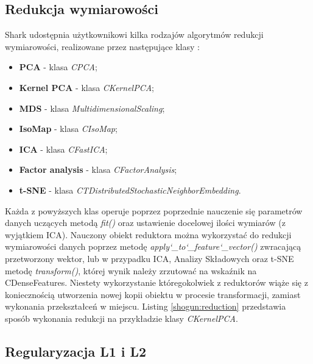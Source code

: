 
\subsection{Redukcja wymiarowości}

Shark udostępnia użytkownikowi kilka rodzajów algorytmów redukcji wymiarowości, realizowane przez następujące klasy \cite{handsOnMachineLearning}:

\begin{itemize}
	\item \textbf{PCA} - klasa \textit{CPCA};
	\item \textbf{Kernel PCA} - klasa \textit{CKernelPCA};
	\item \textbf{MDS} - klasa \textit{MultidimensionalScaling};
	\item \textbf{IsoMap} - klasa \textit{CIsoMap};
	\item \textbf{ICA} - klasa \textit{CFastICA};
	\item \textbf{Factor analysis} - klasa \textit{CFactorAnalysis};
	\item \textbf{t-SNE} - klasa \textit{CTDistributedStochasticNeighborEmbedding}.
\end{itemize}

Każda z powyższych klas operuje poprzez poprzednie nauczenie się parametrów danych uczących metodą \textit{fit()} oraz ustawienie docelowej ilości wymiarów (z wyjątkiem ICA). Nauczony obiekt reduktora można wykorzystać do redukcji wymiarowości danych poprzez metodę \textit{apply\char`_to\char`_feature\char`_vector()} zwracającą przetworzony wektor, lub w przypadku ICA, Analizy Składowych oraz t-SNE metodę \textit{transform()}, której wynik należy zrzutować na wskaźnik na CDenseFeatures. Niestety wykorzystanie któregokolwiek z reduktorów wiąże się z koniecznością utworzenia nowej kopii obiektu w procesie transformacji, zamiast wykonania przekształceń w miejscu. Listing \ref{shogun:reduction} przedstawia sposób wykonania redukcji na przykładzie klasy \textit{CKernelPCA}.


\subsection{Regularyzacja L1 i L2}

